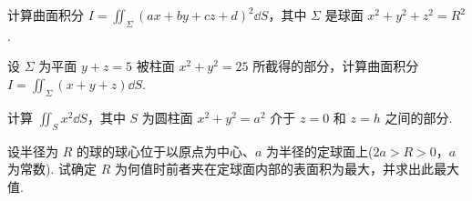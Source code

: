 	\begin{ti}
		计算曲面积分 $I = \iint_{\varSigma} (ax + by + cz + d)^{2} \dd{S}$，其中 $\varSigma$ 是球面 $x^{2} + y^{2} + z^{2} = R^{2}$.
	\end{ti}

	\begin{ti}
		设 $\varSigma$ 为平面 $y + z = 5$ 被柱面 $x^{2} + y^{2} = 25$ 所截得的部分，计算曲面积分 $I = \iint_{\varSigma} (x + y + z) \dd{S}$.
	\end{ti}

	\begin{ti}
		计算 $\iint_{S} x^{2} \dd{S}$，其中 $S$ 为圆柱面 $x^{2} + y^{2} = a^{2}$ 介于 $z = 0$ 和 $z = h$ 之间的部分.
	\end{ti}

	\begin{ti}
		设半径为 $R$ 的球的球心位于以原点为中心、$a$ 为半径的定球面上($2a > R > 0$，$a$ 为常数). 试确定 $R$ 为何值时前者夹在定球面内部的表面积为最大，并求出此最大值.
	\end{ti}